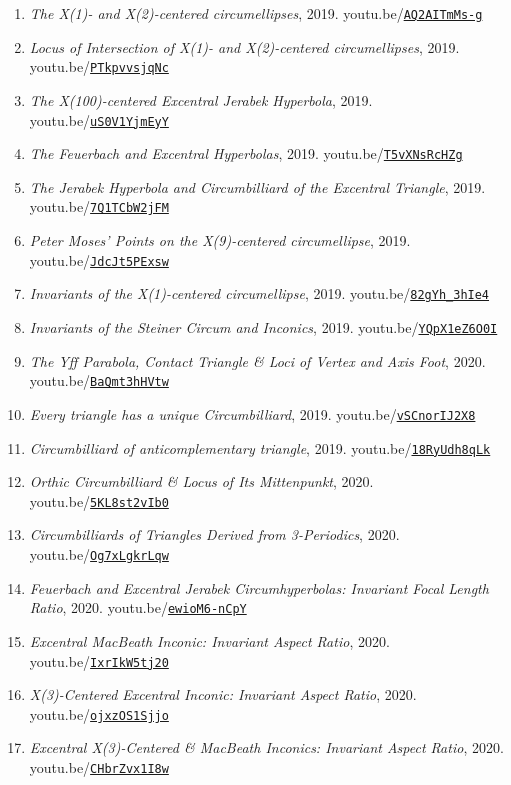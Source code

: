\documentclass[12pt]{article}
\begin{document}
\begin{enumerate}[resume]
\item \textit{The X(1)- and X(2)-centered circumellipses}, 2019. youtu.be/\href{https://youtu.be/AQ2AITmMs-g}{\nolinkurl{AQ2AITmMs-g}}
\item \textit{Locus of Intersection of X(1)- and X(2)-centered circumellipses}, 2019. youtu.be/\href{https://youtu.be/PTkpvvsjqNc}{\nolinkurl{PTkpvvsjqNc}}
\item \textit{The X(100)-centered Excentral Jerabek Hyperbola}, 2019. youtu.be/\href{https://youtu.be/uS0V1YjmEyY}{\nolinkurl{uS0V1YjmEyY}}
\item \textit{The Feuerbach and Excentral Hyperbolas}, 2019. youtu.be/\href{https://youtu.be/T5vXNsRcHZg}{\nolinkurl{T5vXNsRcHZg}}
\item \textit{The Jerabek Hyperbola and Circumbilliard of the Excentral Triangle}, 2019. youtu.be/\href{https://youtu.be/7Q1TCbW2jFM}{\nolinkurl{7Q1TCbW2jFM}}
\item \textit{Peter Moses' Points on the X(9)-centered circumellipse}, 2019. youtu.be/\href{https://youtu.be/JdcJt5PExsw}{\nolinkurl{JdcJt5PExsw}}
\item \textit{Invariants of the X(1)-centered circumellipse}, 2019. youtu.be/\href{https://youtu.be/82gYh_3hIe4}{\nolinkurl{82gYh\_3hIe4}}
\item \textit{Invariants of the Steiner Circum and Inconics}, 2019. youtu.be/\href{https://youtu.be/YQpX1eZ6O0I}{\nolinkurl{YQpX1eZ6O0I}}
\item \textit{The Yff Parabola, Contact Triangle \& Loci of Vertex and Axis Foot}, 2020. youtu.be/\href{https://youtu.be/BaQmt3hHVtw}{\nolinkurl{BaQmt3hHVtw}}
\item \textit{Every triangle has a unique Circumbilliard}, 2019. youtu.be/\href{https://youtu.be/vSCnorIJ2X8}{\nolinkurl{vSCnorIJ2X8}}
\item \textit{Circumbilliard of anticomplementary triangle}, 2019. youtu.be/\href{https://youtu.be/18RyUdh8qLk}{\nolinkurl{18RyUdh8qLk}}
\item \textit{Orthic Circumbilliard \& Locus of Its Mittenpunkt}, 2020. youtu.be/\href{https://youtu.be/5KL8st2vIb0}{\nolinkurl{5KL8st2vIb0}}
\item \textit{Circumbilliards of Triangles Derived from 3-Periodics}, 2020. youtu.be/\href{https://youtu.be/Og7xLgkrLqw}{\nolinkurl{Og7xLgkrLqw}}
\item \textit{Feuerbach and Excentral Jerabek Circumhyperbolas: Invariant Focal Length Ratio}, 2020. youtu.be/\href{https://youtu.be/ewioM6-nCpY}{\nolinkurl{ewioM6-nCpY}}
\item \textit{Excentral MacBeath Inconic: Invariant Aspect Ratio}, 2020. youtu.be/\href{https://youtu.be/IxrIkW5tj20}{\nolinkurl{IxrIkW5tj20}}
\item \textit{X(3)-Centered Excentral Inconic: Invariant Aspect Ratio}, 2020. youtu.be/\href{https://youtu.be/ojxzOS1Sjjo}{\nolinkurl{ojxzOS1Sjjo}}
\item \textit{Excentral X(3)-Centered \& MacBeath Inconics: Invariant Aspect Ratio}, 2020. youtu.be/\href{https://youtu.be/CHbrZvx1I8w}{\nolinkurl{CHbrZvx1I8w}}
\end{enumerate}
\end{document}
